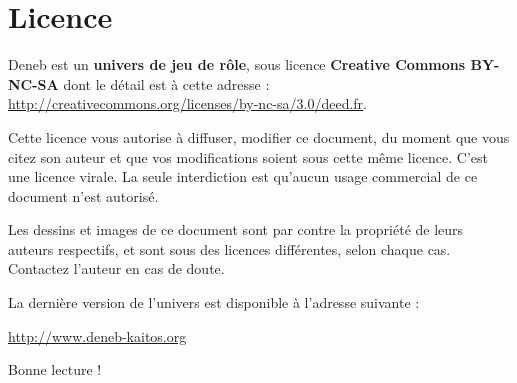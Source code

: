 \clearpage

\chapter*{Licence}

Deneb est un \textbf{univers de jeu de rôle}, sous licence \textbf{Creative Commons BY-NC-SA} dont le détail est à cette adresse : \url{http://creativecommons.org/licenses/by-nc-sa/3.0/deed.fr}.

Cette licence vous autorise à diffuser, modifier ce document, du moment que vous citez son auteur et que vos modifications soient sous cette même licence. C'est une licence virale. La seule interdiction est qu'aucun usage commercial de ce document n'est autorisé.

Les dessins et images de ce document sont par contre la propriété de leurs auteurs respectifs, et sont sous des licences différentes, selon chaque cas. Contactez l'auteur en cas de doute.


\bigskip

La dernière version de l'univers est disponible à l'adresse suivante :

\medskip

\begin{center}
\Large\url{http://www.deneb-kaitos.org}
\end{center}
\bigskip

\vfill

\begin{center}
  \Large Bonne lecture !
\end{center}


\vskip 20pt
